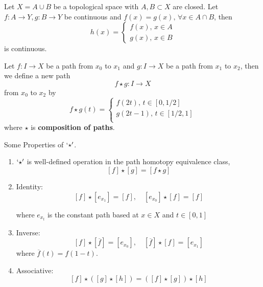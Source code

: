 \documentclass[12pt]{amsart}
\begin{document}
\begin{lemma}
    Let $X = A \cup B$ be a topological space with $A, B \subset X$ are closed. Let $f: A \to Y, g: B \to Y$ be continuous and $f(x) = g(x), \, \forall x \in A \cap B$, then 
    \[h(x) = \begin{cases*}
        f(x), \, x \in A \\ 
        g(x), \, x \in B
    \end{cases*}\]
    is continuous.
\end{lemma}

\begin{definition}
     Let $f: I \to X$ be a path from $x_0$ to $x_1$ and $g: I \to X$ be a path from $x_1$ to $x_2$, then we define a new path 
    \[f \star g: I \to X\]
    from $x_0$ to $x_2$ by 
    \[f \star g (t) = \begin{cases*}
        f(2t), \, t \in [0, 1/2] \\ 
        g(2t-1), \, t \in [1/2, 1] \\ 
    \end{cases*}\]
    where $\star$ is \textbf{composition of paths}. 

    Some Properties of $`\star'$. 
    \begin{enumerate}
        \item $`\star'$ is well-defined operation in the path homotopy equivalence class, 
        \[[f] \star [g] = [f \star g]\]
        \item Identity: 
        \[[f] \star [e_{x_1}] = [f], \quad [e_{x_0}] \star [f] = [f]\]

        where $e_{x_t}$ is the constant path based at $x \in X$ and $t \in [0,1]$

        \item Inverse: 
        \[[f]\star[\overline{f}] = [e_{x_0}], \quad [\overline f] \star [f] = [e_{x_1}]\]
        where $\overline{f}(t) = f(1-t)$. 

        \item Associative: 
        \[[f] \star ([g]\star[h]) = ([f]\star [g]) \star [h]\]
    \end{enumerate}
\end{definition}
\end{document}
